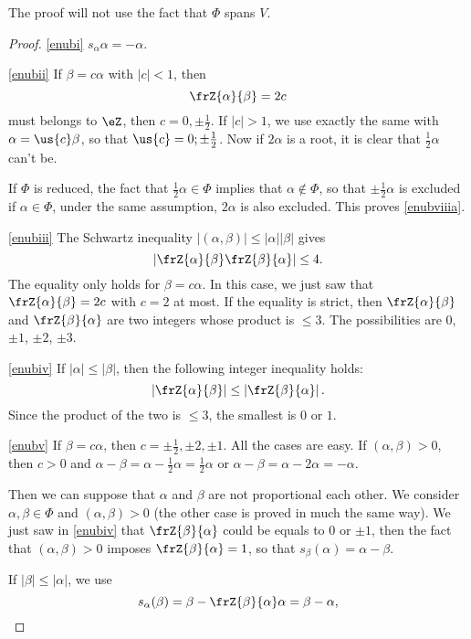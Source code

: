 The proof will not use the fact that $\Phi$ spans $V$.

\begin{proof}
\ref{enubi} $s_{\alpha}\alpha=-\alpha$.

\ref{enubii} If $\beta=c\alpha$ with $|c|<1$, then 
\[
\frZ{\alpha}{\beta}=2c
\]
must belongs to $\eZ$, then $c=0,\pm\frac{1}{2}$. If $|c|>1$, we use exactly the same with $\alpha=\us{c}\beta$, so that $\us{c}=0;\pm\frac{1}{2}$. Now if $2\alpha$ is a root, it is clear that $\frac{1}{2}\alpha$ can't be.

If $\Phi$ is reduced, the fact that $\frac{1}{2}\alpha\in\Phi$ implies that $\alpha\notin\Phi$, so that $\pm\frac{1}{2}\alpha$ is excluded if $\alpha\in\Phi$, under the same assumption, $2\alpha$ is also excluded. This proves \ref{enubviiia}.

\ref{enubiii} The Schwartz inequality $|(\alpha,\beta)|\leq|\alpha||\beta|$ gives
\[
\left|   \frZ{\alpha}{\beta}\frZ{\beta}{\alpha}     \right|\leq 4.
\]
The equality only holds for $\beta=c\alpha$. In this case, we just saw that $\frZ{\alpha}{\beta}=2c$ with $c=2$ at most. If the equality is strict, then $\frZ{\alpha}{\beta}$ and $\frZ{\beta}{\alpha}$ are two integers whose product is $\leq 3$. The possibilities are $0$, $\pm 1$, $\pm 2$, $\pm 3$.

\ref{enubiv} If $|\alpha|\leq|\beta|$, then the following integer inequality holds:
\[
\left|\frZ{\alpha}{\beta}   \right|\leq\left|\frZ{\beta}{\alpha}   \right|.
\]
Since the product of the two  is $\leq 3$, the smallest is $0$ or $1$.

\ref{enubv}
If $\beta=c\alpha$, then $c=\pm\frac{1}{2},\pm 2,\pm 1$. All the cases are easy. If $(\alpha,\beta)>0$, then $c>0$ and $\alpha-\beta= \alpha-\frac{1}{2}\alpha=\frac{1}{2}\alpha$ or $\alpha-\beta=\alpha-2\alpha=-\alpha$.

Then we can suppose that $\alpha$ and $\beta$ are not proportional each other. We consider $\alpha,\beta\in\Phi$ and $(\alpha,\beta)>0$ (the other case is proved in much the same way). We just saw in \ref{enubiv} that $\frZ{\beta}{\alpha}$ could be equals to $0$ or $\pm 1$, then the fact that $(\alpha,\beta)>0$ imposes $\frZ{\beta}{\alpha}=1$, so that $s_{\beta}(\alpha)=\alpha-\beta$.

If $|\beta|\leq|\alpha|$, we use
\begin{equation}
s_{\alpha}(\beta)=\beta-\frZ{\beta}{\alpha}\alpha
               =\beta-\alpha,
\end{equation}


\end{proof}
